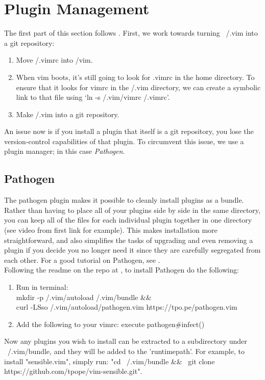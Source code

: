 \section{Plugin Management}
The first part of this section follows \cite{neil2010synchronizing}. First, we
work towards turning ~/.vim into a git repository:
\begin{enumerate}
    \item Move \tsim/.vimrc into \tsim/vim.
    \item When vim boots, it's still going to look for .vimrc in the home
        directory. To ensure that it looks for vimrc in the \tsim/.vim
        directory, we can create a symbolic link to that file using `ln -s
        \tsim/.vim/vimrc \tsim/.vimrc'.  \item Make \tsim/.vim into a git
        repository.
\end{enumerate}
An issue now is if you install a plugin that itself is a git repository, you
lose the version-control capabilities of that plugin. To circumvent this issue,
we use a plugin manager; in this case \textit{Pathogen}.\\

\subsection{Pathogen} \label{SecPathogen}
The pathogen plugin makes it possible to cleanly install plugins as a bundle.
Rather than having to place all of your plugins side by side in the same
directory, you can keep all of the files for each individual plugin together in
one directory (see video from first link for example). This makes installation
more straightforward, and also simplifies the tasks of upgrading and even
removing a plugin if you decide you no longer need it since they are carefully
segregated from each other. For a good tutorial on Pathogen, see
\cite{lafourcade2014how}.\\

Following the readme on the repo at \cite{pope2009pathogen}, to install Pathogen
do the following:
\begin{enumerate}
    \item Run in terminal:\\
        mkdir -p \tsim/.vim/autoload \tsim/.vim/bundle \&\& \ \\ curl -LSso
        \tsim/.vim/autoload/pathogen.vim https://tpo.pe/pathogen.vim
    \item Add the following to your vimrc:
        execute pathogen\#infect()
\end{enumerate}
Now any plugins you wish to install can be extracted to a subdirectory under
~/.vim/bundle, and they will be added to the 'runtimepath'. For example, to
install "sensible.vim", simply run: "cd ~/.vim/bundle \&\& \ git clone
https://github.com/tpope/vim-sensible.git".

